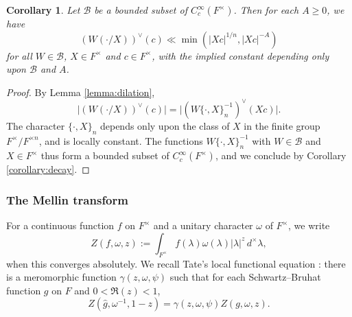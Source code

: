 \documentclass[reqno]{amsart}
\theoremstyle{plain}
\newtheorem{corollary}[theorem]{Corollary}
\theoremstyle{definition}
\theoremstyle{itplain}
\numberwithin{equation}{section}
\numberwithin{theorem}{section}
\begin{document}
\begin{corollary}\label{corollary:uniform-dilates}
  Let $\mathcal{B}$ be a bounded subset of $C_c^\infty(F^\times)$.  Then for each $A \geq 0$, we have
  \begin{equation*}
    \left( W(\cdot / X) \right)^\vee(c) \ll \min \left( \lvert X c \rvert^{1/n}, \lvert X c \rvert^{-A} \right)
  \end{equation*}
  for all $W \in \mathcal{B}$, $X \in F^\times$ and $c \in F^\times$, with the implied constant depending only upon $\mathcal{B}$ and $A$.
\end{corollary}
\begin{proof}
  By Lemma \ref{lemma:dilation},
  \begin{equation*}
    \lvert (W(\cdot / X))^\vee(c) \rvert = \lvert (W \{\cdot, X\}_n^{-1})^\vee(X c) \rvert.
  \end{equation*}
  The character $\{\cdot, X\}_n$ depends only upon the class of $X$ in the finite group $F^\times / F^{\times n}$, and is locally constant.  The functions $W \{\cdot, X\}_n^{-1}$ with $W \in \mathcal{B}$ and $X \in F^\times$ thus form a bounded subset of $C_c^\infty(F^\times)$, and we conclude by Corollary \ref{corollary:decay}.
\end{proof}

\subsubsection{The Mellin transform}\label{sec:mellin}
For a continuous function $f$ on $F^\times$ and a unitary character $\omega$ of $F^\times$, we write
\begin{equation*}
  Z(f, \omega, z) := \int_{F^\times} f(\lambda) \omega(\lambda) \lvert \lambda \rvert^{z} \, d^\times \lambda,
\end{equation*}
when this converges absolutely.  We recall Tate's local functional equation \cite{MR0217026}: there is a meromorphic function $\gamma(z, \omega, \psi)$ such that for each Schwartz--Bruhat function $g$ on $F$ and $0 < \Re(z) < 1$,
\begin{equation}\label{eq:tate}
  Z(\hat{g}, \omega^{-1}, 1 - z) = \gamma(z, \omega, \psi) Z(g, \omega, z).
\end{equation}
\end{document}
